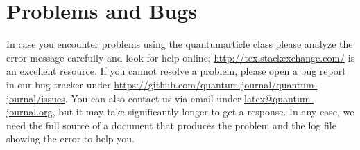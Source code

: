 \documentclass[a4paper,twocolumn,11pt]{quantumarticle}
\begin{document}
\section{Problems and Bugs}
In case you encounter problems using the quantumarticle class please analyze the error message carefully and look for help online; \href{http://tex.stackexchange.com/}{http://tex.stackexchange.com/} is an excellent resource.
If you cannot resolve a problem, please open a bug report in our bug-tracker under \href{https://github.com/quantum-journal/quantum-journal/issues}{https://github.com/quantum-journal/quantum-journal/issues}.
You can also contact us via email under \href{mailto:latex@quantum-journal.org}{latex@quantum-journal.org}, but it may take significantly longer to get a response.
In any case, we need the full source of a document that produces the problem and the log file showing the error to help you.
\end{document}
